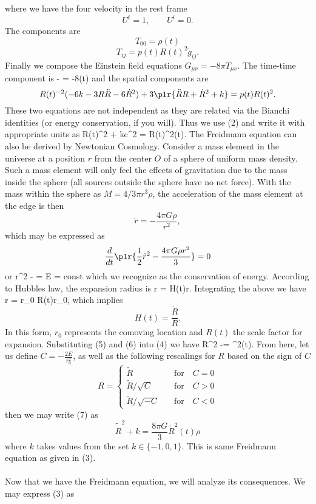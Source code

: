 \documentclass[10pt,letterpaper]{article}
\begin{document}
where we have the four velocity in the rest frame 
\[
	U^t = 1,\qquad U^i = 0.
\]
The components are
\[
	T_{00} = \rho(t)
\]
\[
	T_{ij} = p(t)R(t)^2\tilde g_{ij}.
\]
Finally we compose the Einstein field equations $G_{\mu\nu} = -8\pi T_{\mu\nu}$. The time-time component is
\be
	 - = -8\pi \rho(t)
\ee
and the spatial components are
\[
	 R(t)^{-2} (-6k-3R\ddot R -6\dot R^2)+3\plr{ \ddot R R+ \dot R^2 + k} = p(t)R(t)^2.
\]
These two equations are not independent as they are related via the Bianchi identities (or energy conservation, if you will). Thus we use (2) and write it with appropriate units as
\be
	\dot R(t)^2 + kc^2 = R(t)^2\rho(t).
\ee
The Freidmann equation can also be derived by Newtonian Cosmology. Consider a mass element in the universe at a position $r$ from the center $O$ of a sphere of uniform mass density. Such a mass element will only feel the effects of gravitation due to the mass inside the sphere (all sources outside the sphere have no net force). With the mass within the sphere as $M = 4/3\pi r^3 \rho$, the acceleration of the mass element at the edge is then
\[
	 \ddot r = -\frac{4\pi G \rho}{r^2},
\]
which may be expressed as 
\[
	\frac{d}{dt}\plr{ \frac12 \dot r^2 - \frac{4\pi G\rho r^2}{3}}=0
\]
or
\be
	 \dot r^2 -   = E = const
\ee
which we recognize as the conservation of energy. According to Hubbles law, the expansion radius is
\be
	\dot r = H(t)r.
\ee
Integrating the above we have
\be
	r = r_0 \exp{} \equiv R(t)r_0,
\ee
which implies
\[
	H(t) = \frac{\dot R}{R}.
\]
In this form, $r_0$ represents the comoving location and $R(t)$ the scale factor for expansion. Substituting (5) and (6) into (4) we have
\be
	\dot R^2 -= ^2(t)\rho.
\ee
From here, let us define $C = -\frac{2E}{r_0^2}$, as well as the following rescalings for $R$ based on the sign of $C$
\[
	R = \begin{cases} \tilde R\quad &\text{for}\quad C = 0\\ \tilde R/\sqrt C\quad &\text{for}\quad C > 0 \\ \tilde R/\sqrt{-C} \quad &\text{for}\quad C < 0
	\end{cases}
\]
then we may write (7) as
\[
	\tilde{\dot R}^2+k= \frac{8\pi G}{3}{\tilde R}^2(t)\rho
\]
where $k$ takes values from the set $k\in\{-1,0,1\}$. This is same Freidmann equation as given in (3). 
\\ \\
Now that we have the Freidmann equation, we will analyze its consequences. We may express (3) as
\end{document}

